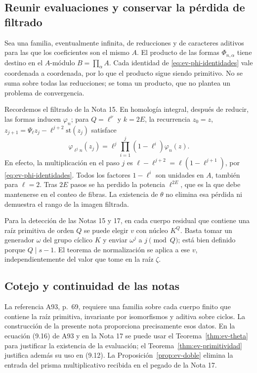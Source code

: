 \subsection{Reunir evaluaciones y conservar la pérdida de filtrado}

Sea una familia, eventualmente infinita, de reducciones y de caracteres aditivos para las que los coeficientes son el mismo $A$. El producto de las formas $\Phi_{n,\alpha}$ tiene destino en el $A$-módulo $B=\prod_\alpha A$. Cada identidad de \eqref{eq:ev-phi-identidades} vale coordenada a coordenada, por lo que el producto sigue siendo primitivo. No se suma sobre todas las reducciones; se toma un producto, que no plantea un problema de convergencia.

Recordemos el filtrado de la Nota 15. En homología integral, después de reducir, las formas inducen $\varphi_n$; para $Q=\ell^\nu$ y $k=2E$, la recurrencia $z_0=z$, $z_{j+1}=\Psi_\ell z_j-\ell^{j+2}\mathrm{st}(z_j)$ satisface
\begin{equation}
 \varphi_{\ell^j n}(z_j)=\ell^j\prod_{i=1}^j(1-\ell^i)\varphi_n(z).
 \label{eq:ev-filtrado}
\end{equation}
En efecto, la multiplicación en el paso $j$ es $\ell-\ell^{j+2}=\ell(1-\ell^{j+1})$, por \eqref{eq:ev-phi-identidades}. Todos los factores $1-\ell^i$ son unidades en $A$, también para $\ell=2$. Tras $2E$ pasos se ha perdido la potencia $\ell^{2E}$, que es la que debe mantenerse en el conteo de fibras. La existencia de $\theta$ no elimina esa pérdida ni demuestra el rango de la imagen filtrada.

Para la detección de las Notas 15 y 17, en cada cuerpo residual que contiene una raíz primitiva de orden $Q$ se puede elegir $v$ con núcleo $K^Q$. Basta tomar un generador $\omega$ del grupo cíclico $K$ y enviar $\omega^j$ a $j\pmod Q$; está bien definido porque $Q\mid s-1$. El teorema de normalización se aplica a ese $v$, independientemente del valor que tome en la raíz $\zeta$.

\subsection{Cotejo y continuidad de las notas}

La referencia A93, p.~69, requiere una familia sobre cada cuerpo finito que contiene la raíz primitiva, invariante por isomorfismos y aditiva sobre ciclos. La construcción de la presente nota proporciona precisamente esos datos. En la ecuación (9.16) de A93 y en la Nota 17 se puede usar el Teorema~\ref{thm:ev-theta} para justificar la existencia de la evaluación; el Teorema~\ref{thm:ev-primitividad} justifica además su uso en (9.12). La Proposición~\ref{prop:ev-doble} elimina la entrada del prisma multiplicativo recibida en el pegado de la Nota 17.

